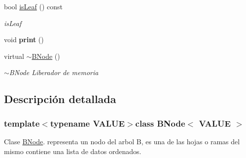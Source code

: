 \begin{DoxyCompactItemize}
\item 
bool \hyperlink{classBNode_a64a90eaeefe69e066fd2abceb3a8a86e}{is\-Leaf} () const 
\begin{DoxyCompactList}\small\item\em is\-Leaf \end{DoxyCompactList}\item 
\hypertarget{classBNode_a7f086008f07ee778fc3b7b05ebdf8e34}{void {\bfseries print} ()}\label{classBNode_a7f086008f07ee778fc3b7b05ebdf8e34}

\item 
\hypertarget{classBNode_ac92421575ed510386d4e4ec1ab8ab1a4}{virtual \hyperlink{classBNode_ac92421575ed510386d4e4ec1ab8ab1a4}{$\sim$\-B\-Node} ()}\label{classBNode_ac92421575ed510386d4e4ec1ab8ab1a4}

\begin{DoxyCompactList}\small\item\em $\sim$\-B\-Node Liberador de memoria \end{DoxyCompactList}\end{DoxyCompactItemize}


\subsection{Descripción detallada}
\subsubsection*{template$<$typename V\-A\-L\-U\-E$>$class B\-Node$<$ V\-A\-L\-U\-E $>$}

Clase \hyperlink{classBNode}{B\-Node}. representa un nodo del arbol B, es una de las hojas o ramas del mismo contiene una lista de datos ordenados. 

